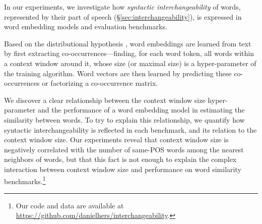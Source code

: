 \documentclass[11pt,a4paper]{article}
\begin{document}
    In our experiments, we investigate how
    \textit{syntactic interchangeability} of words,
    represented by their part of speech (\S\ref{sec:interchangeability}),
    is expressed in word embedding models and evaluation benchmarks.
    
    Based on the distributional hypothesis \cite{harris1954distributional},
    word embeddings are learned from text
    by first extracting co-occurrences---finding, for each word token, all
    words within a context window around it,
    whose size (or maximal size) is a hyper-parameter of the training algorithm.
    Word vectors are then learned by predicting these co-occurrences or
    factorizing a co-occurrence matrix.

    We discover a clear relationship between the context window size hyper-parameter
    and the performance of a word embedding model in estimating the similarity between words.
    To try to explain this relationship, we quantify how syntactic interchangeability
    is reflected in each benchmark,
    and its relation to the context window size.
    Our experiments reveal that context window size is negatively correlated
    with the number of same-POS words among the nearest neighbors of words,
    but that this fact is not enough to explain the complex interaction between
    context window size and performance on word similarity
    benchmarks.\footnote{Our code and data are available at \url{https://github.com/danielhers/interchangeability}.}
    
\end{document}
